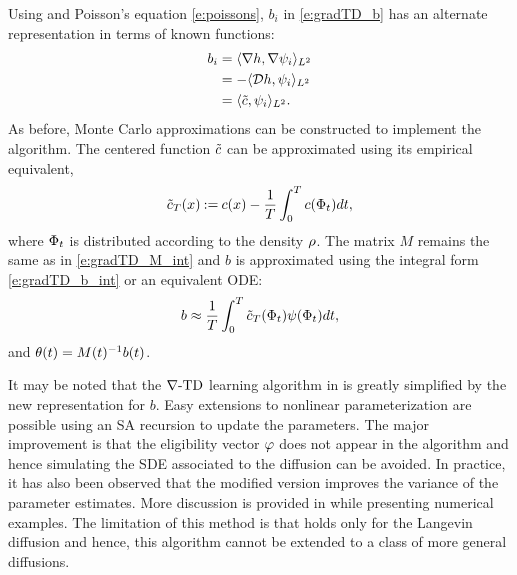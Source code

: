 Using  and Poisson's equation \eqref{e:poissons}, $b_i$ in \eqref{e:gradTD_b} has an alternate representation in terms of known functions:
\begin{equation}
\begin{aligned}
b_i & = \langle \nabla h, \nabla \basis_i \rangle_{L^2} \\ 
& = - \langle \generate h, \basis_i \rangle_{L^2} \\ 
& =\langle \tilc, \basis_i \rangle_{L^2}.
\label{e:b_alt}
\end{aligned}
\end{equation}
As before, Monte Carlo approximations can be constructed to implement the algorithm. The centered function $\tilde c$ can be approximated using its empirical equivalent,
\begin{equation}
\tilde c_T(x) \mathbin{:=} c(x) - \frac{1}{T} \int_0^T c(\Phi_t) dt,
\end{equation}
where $\Phi_t$ is distributed according to the density $\rho$. The matrix $M$ remains the same as in \eqref{e:gradTD_M_int} and $b$ is approximated using the integral form \eqref{e:gradTD_b_int} or an equivalent ODE:
\begin{equation}
b \approx \frac{1}{T} \int_0^T \tilc_T(\markovstate_t) \basis(\markovstate_t) dt,
\label{e:gradTD_b_int}
\end{equation}
and $\theta(t) = M(t)^{-1} b(t)$. 

It may be noted that the $\nabla\text{-TD}$ learning algorithm in  is greatly simplified by the new representation for $b$. Easy extensions to nonlinear parameterization are possible using an SA recursion to update the parameters. The major improvement is that the eligibility vector $\varphi$ does not appear in the algorithm and hence simulating the SDE associated to the diffusion can be avoided. In practice, it has also been observed that the modified version improves the variance of the parameter estimates. More discussion is provided in \Chapter{} while presenting numerical examples. The limitation of this method is that  holds only for the Langevin diffusion and hence, this algorithm cannot be extended to a class of more general diffusions. 
 
